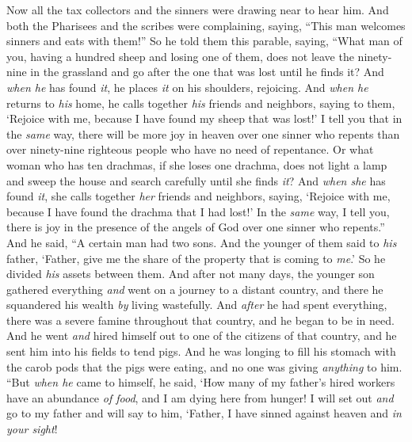 \begin{biblechapter} %
 Now all the tax collectors and the sinners were drawing near to hear him.
\verse And both the Pharisees and the scribes were complaining, saying, “This man welcomes sinners and eats with them!”
\verse So he told them this parable, saying,
\verse “What man of you, having a hundred sheep and losing one of them, does not leave the ninety-nine in the grassland and go after the one that was lost until he finds it?
\verse And \textit{when he} has found \textit{it}, he places \textit{it} on his shoulders, rejoicing.
\verse And \textit{when he} returns to \textit{his} home, he calls together \textit{his} friends and neighbors, saying to them, ‘Rejoice with me, because I have found my sheep that was lost!’
\verse I tell you that in the \textit{same} way, there will be more joy in heaven over one sinner who repents than over ninety-nine righteous people who have no need of repentance.
 Or what woman who has ten drachmas, if she loses one drachma, does not light a lamp and sweep the house and search carefully until she finds \textit{it}?
\verse And \textit{when she} has found \textit{it}, she calls together \textit{her} friends and neighbors, saying, ‘Rejoice with me, because I have found the drachma that I had lost!’
\verse In the \textit{same} way, I tell you, there is joy in the presence of the angels of God over one sinner who repents.”
 And he said, “A certain man had two sons.
\verse And the younger of them said to \textit{his} father, ‘Father, give me the share of the property that is coming to \textit{me}.’ So he divided \textit{his} assets between them.
\verse And after not many days, the younger son gathered everything \textit{and} went on a journey to a distant country, and there he squandered his wealth \textit{by} living wastefully.
\verse And \textit{after} he had spent everything, there was a severe famine throughout that country, and he began to be in need.
\verse And he went \textit{and} hired himself out to one of the citizens of that country, and he sent him into his fields to tend pigs.
\verse And he was longing to fill his stomach with the carob pods that the pigs were eating, and no one was giving \textit{anything} to him.
\verse “But \textit{when he} came to himself, he said, ‘How many of my father’s hired workers have an abundance \textit{of food}, and I am dying here from hunger!
\verse I will set out \textit{and} go to my father and will say to him, ‘Father, I have sinned against heaven and \textit{in your sight}!

\end{biblechapter}
